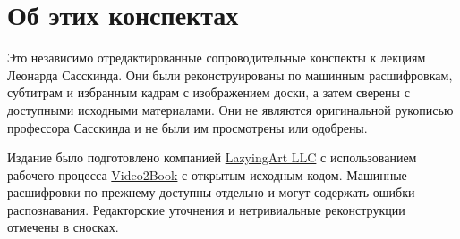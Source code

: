 \documentclass[11pt,oneside]{book}
\begin{document}
\frontmatter
\hypersetup{pageanchor=false}

\hypersetup{pageanchor=true}

\clearpage
\chapter*{Об этих конспектах}
Это независимо отредактированные сопроводительные конспекты к лекциям Леонарда Сасскинда. Они были реконструированы по машинным расшифровкам, субтитрам и избранным кадрам с изображением доски, а затем сверены с доступными исходными материалами. Они не являются оригинальной рукописью профессора Сасскинда и не были им просмотрены или одобрены.

Издание было подготовлено компанией \href{https://lazying.art}{LazyingArt LLC} с использованием рабочего процесса \href{https://github.com/lachlanchen/Video2Book}{Video2Book} с открытым исходным кодом. Машинные расшифровки по-прежнему доступны отдельно и могут содержать ошибки распознавания. Редакторские уточнения и нетривиальные реконструкции отмечены в сносках.
\clearpage
\tableofcontents
\mainmatter










\end{document}
